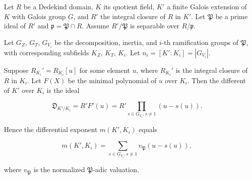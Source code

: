Let $R$ be a Dedekind domain, $K$ its quotient field, $K'$ a finite Galois extension of $K$ with Galois group $G$, and $R'$ the integral closure of $R$ in $K'$. Let $\mathfrak{P}$ be a prime ideal of $R'$ and $\mathfrak{p} = \mathfrak{P} \cap R$. Assume $R'/\mathfrak{P}$ is separable over $R/\mathfrak{p}$.

Let $G_Z$, $G_T$, $G_{V_i}$ be the decomposition, inertia, and $i$-th ramification groups of $\mathfrak{P}$, with corresponding subfields $K_Z$, $K_T$, $K_i$. Let $n_i = [K' : K_i] = |G_{V_i}|$.

Suppose $R_{K_i}' = R_{K_i}[u]$ for some element $u$, where $R_{K_i}'$ is the integral closure of $R$ in $K_i$. Let $F(X)$ be the minimal polynomial of $u$ over $K_i$. Then the different of $K'$ over $K_i$ is the ideal

$$\mathfrak{D}_{K'/K_i} = R' F'(u) = R' \prod_{s \in G_{V_i}, s \neq 1} (u - s(u)).$$

Hence the differential exponent $m(K', K_i)$ equals

$$m(K', K_i) = \sum_{s \in G_{V_i}, s \neq 1} v_{\mathfrak{P}}(u - s(u)),$$

where $v_{\mathfrak{P}}$ is the normalized $\mathfrak{P}$-adic valuation.
